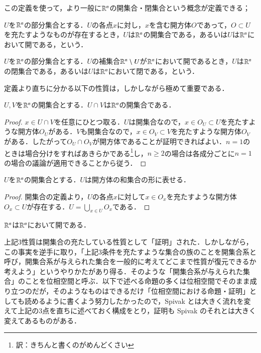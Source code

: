 この定義を使って，より一般に$\mathbb{R}^n$の開集合・閉集合という概念が定義できる；
\begin{defi}
$U$を$\mathbb{R}^n$の部分集合とする．$U$の各点$x$に対し，$x$を含む開方体$O$であって，$O \subset U$を充たすようなものが存在するとき，$U$は$\mathbb{R}^n$の開集合である，あるいは$U$は$\mathbb{R}^n$において開である，という．
\end{defi}

\begin{defi}
$U$を$\mathbb{R}^n$の部分集合とする．$U$の補集合$\mathbb{R}^n \setminus U$が$\mathbb{R}^n$において開であるとき，$U$は$\mathbb{R}^n$の閉集合である，あるいは$U$は$\mathbb{R}^n$において閉である，という．
\end{defi}



定義より直ちに分かる以下の性質は，しかしながら極めて重要である．

\begin{thm}
$U,V$を$\mathbb{R}^n$の開集合とする．$U \cap V$は$\mathbb{R}^n$の開集合である．
\end{thm}

\begin{proof}
$x \in U \cap V$を任意にひとつ取る．$U$は開集合なので，$x \in O_U \subset U$を充たすような開方体$O_U$がある．$V$も開集合なので，$x \in O_V \subset V$を充たすような開方体$O_V$がある．したがって$O_U \cap O_V$が開方体であることが証明できればよい．$n=1$のときは場合分けをすればあきらかである\footnote{訳：きちんと書くのがめんどくさい}し，$n \geq 2$の場合は各成分ごとに$n=1$の場合の議論が適用できることから従う．
\end{proof}

\begin{thm}
$U$を$\mathbb{R}^n$の開集合とする．$U$は開方体の和集合の形に表せる．
\end{thm}

\begin{proof}
開集合の定義より，$U$の各点$x$に対して$x \in O_x$を充たすような開方体$O_x \subset U$が存在する．$U = \bigcup_{x \in U}O_x$である．
\end{proof}

\begin{que}
$\mathbb{R}^n$は$\mathbb{R}^n$において開である．
\end{que}

\begin{dig}
上記3性質は開集合の充たしている性質として「証明」された．しかしながら，この事実を逆手に取り，「上記3条件を充たすような集合の族のことを開集合系と呼び，開集合系が与えられた集合を一般的に考えてどこまで性質が復元できるか考えよう」というやりかたがあり得る．そのような「開集合系が与えられた集合」のことを位相空間と呼ぶ．以下で述べる命題の多くは位相空間でそのまま成り立つのだが，そのようなものはできるだけ「位相空間における命題・証明」としても読めるように書くよう努力したかったので，Spivak とは大きく流れを変えて上記の3点を直ちに述べておく構成をとり，証明も Spivak のそれとは大きく変えてあるものがある．
\end{dig}


